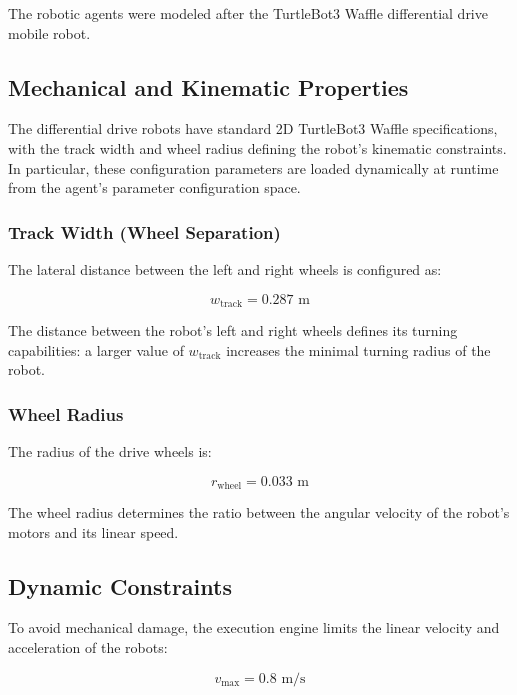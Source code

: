 The robotic agents were modeled after the TurtleBot3 Waffle differential drive mobile robot.

\subsection{Mechanical and Kinematic Properties}

The differential drive robots have standard 2D TurtleBot3 Waffle specifications, with the track width and wheel radius defining the robot's kinematic constraints. In particular, these configuration parameters are loaded dynamically at runtime from the agent's parameter configuration space.

\subsubsection{Track Width (Wheel Separation)}

The lateral distance between the left and right wheels is configured as:

\begin{equation}
w_{\text{track}} = 0.287\text{ m}
\end{equation}

The distance between the robot's left and right wheels defines its turning capabilities: a larger value of $w_{\text{track}}$ increases the minimal turning radius of the robot.

\subsubsection{Wheel Radius}

The radius of the drive wheels is:

\begin{equation}
r_{\text{wheel}} = 0.033\text{ m}
\end{equation}

The wheel radius determines the ratio between the angular velocity of the robot's motors and its linear speed.

\subsection{Dynamic Constraints}

To avoid mechanical damage, the execution engine limits the linear velocity and acceleration of the robots:

\begin{equation}
v_{\text{max}} = 0.8\text{ m/s}
\end{equation}

